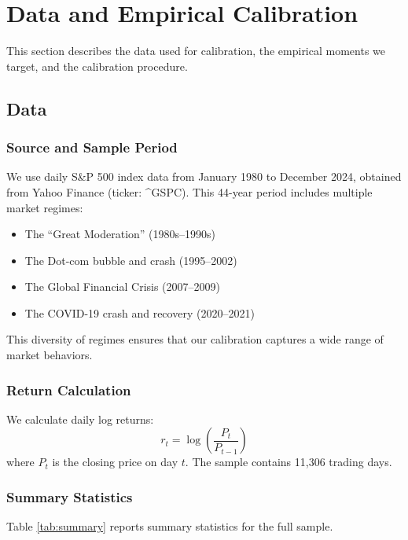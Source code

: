 \section{Data and Empirical Calibration}
\label{sec:calibration}

This section describes the data used for calibration, the empirical moments we target, and the calibration procedure.

\subsection{Data}

\subsubsection{Source and Sample Period}

We use daily S\&P 500 index data from January 1980 to December 2024, obtained from Yahoo Finance (ticker: \textasciicircum GSPC). This 44-year period includes multiple market regimes:

\begin{itemize}
    \item The ``Great Moderation'' (1980s--1990s)
    \item The Dot-com bubble and crash (1995--2002)
    \item The Global Financial Crisis (2007--2009)
    \item The COVID-19 crash and recovery (2020--2021)
\end{itemize}

This diversity of regimes ensures that our calibration captures a wide range of market behaviors.

\subsubsection{Return Calculation}

We calculate daily log returns:
\begin{equation}
r_t = \log\left(\frac{P_t}{P_{t-1}}\right)
\end{equation}
where $P_t$ is the closing price on day $t$. The sample contains 11,306 trading days.

\subsubsection{Summary Statistics}

Table \ref{tab:summary} reports summary statistics for the full sample.

